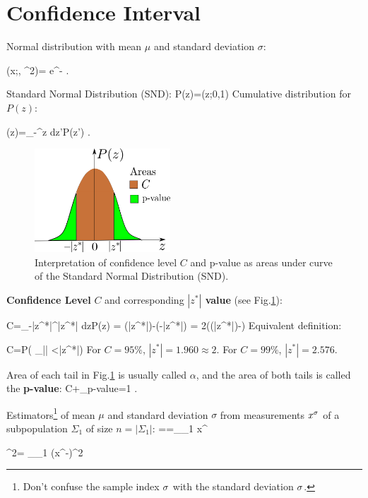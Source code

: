 \section{Confidence Interval}

Normal distribution
with mean $\mu$
and standard deviation $\sigma$:

\beq
\caln(x;\mu, \s^2)=
e^{-\;}
\;.
\eeq

Standard Normal Distribution (SND):
\beq
P(z)=\caln(z;0,1)
\eeq
Cumulative distribution for $P(z)$:

\beq
\Phi(z)=\int_{-\infty}^z dz'\;P(z')
\;.
\eeq

\begin{figure}[h!]
\centering
\includegraphics[width=2in]
{conventions/conf-int.png}
\caption{
Interpretation
of confidence level $C$
and p-value as areas under curve of the
Standard Normal Distribution (SND).}
\label{fig-conf-int}
\end{figure}

{\bf Confidence Level} $C$
and corresponding {\bf $|z^*|$ value}
(see Fig.\ref{fig-conf-int}):

\beq
C=\int_{-|z^*|}^{|z^*|} dz\;P(z) =
\Phi(|z^*|)-\Phi(-|z^*|)
=
2\left(\Phi(|z^*|)-\;\right)
\label{eq-conf-level1}
\eeq
Equivalent definition:

\beq
C=P\left(
_{|\rvz|}
<|z^*|\right)
\label{eq-conf-level2}
\eeq
For $C=95\%$,
$|z^*|=1.960\approx 2$.
For $C=99\%$, $|z^*|=2.576$.

Area of each tail
in Fig.\ref{fig-conf-int} is
usually called $\alpha$,
and the area of both tails is called
the {\bf p-value}:
\beq
C+\underbrace{2\alpha}_{p-value}=1
\;.
\eeq

Estimators\footnote{Don't
confuse the sample index $\sigma$
with the standard deviation $\sigma$.} of
mean $\mu$  and
standard deviation $\sigma$
from measurements $x^\sigma$
of a subpopulation $\Sigma_1$ of
size $n=|\Sigma_1|$:
\beq
\HAT{\mu}==\sum_{\s \in\Sigma_1} x^\s
\eeq

\beq
\HAT{\s}^2=
\sum_{\s\in \Sigma_1} (x^\s-)^2
\eeq


